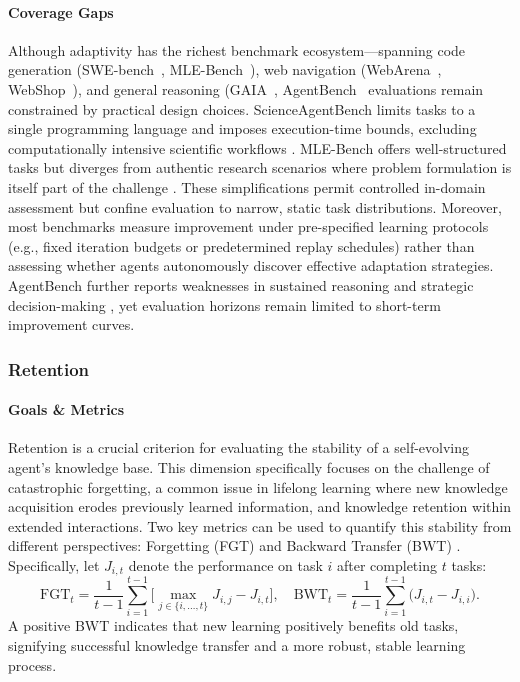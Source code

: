 \documentclass[10pt]{article} %
\begin{document}
\paragraph{Coverage Gaps}
Although adaptivity has the richest benchmark ecosystem—spanning code generation (SWE-bench~\citep{jimenez2023swe}, MLE-Bench~\citep{chan2024mle}), web navigation (WebArena~\citep{zhou2023webarena}, WebShop~\citep{yao2022webshop}), and general reasoning (GAIA~\citep{mialon2023gaia}, AgentBench~\citep{liu2023agentbench} evaluations remain constrained by practical design choices. ScienceAgentBench limits tasks to a single programming language and imposes execution-time bounds, excluding computationally intensive scientific workflows \citep{chen2024scienceagentbench}. MLE-Bench offers well-structured tasks but diverges from authentic research scenarios where problem formulation is itself part of the challenge \citep{chan2024mle}. These simplifications permit controlled in-domain assessment but confine evaluation to narrow, static task distributions. Moreover, most benchmarks measure improvement under pre-specified learning protocols (e.g., fixed iteration budgets or predetermined replay schedules) rather than assessing whether agents autonomously discover effective adaptation strategies. AgentBench further reports weaknesses in sustained reasoning and strategic decision-making \citep{liu2023agentbench}, yet evaluation horizons remain limited to short-term improvement curves.



\subsubsection{Retention}
\paragraph{Goals \& Metrics} Retention is a crucial criterion for evaluating the stability of a self-evolving agent's knowledge base. This dimension specifically focuses on the challenge of catastrophic forgetting, a common issue in lifelong learning where new knowledge acquisition erodes previously learned information, and knowledge retention within extended interactions. Two key metrics can be used to quantify this stability from different perspectives: Forgetting (FGT) and Backward Transfer (BWT) \citep{zheng2025lifelong}. Specifically, let $J_{i,t}$ denote the performance on task $i$ after completing $t$ tasks:
\[
\mathrm{FGT}_t = \frac{1}{t-1} \sum_{i=1}^{t-1}\!\Big[\max_{j\in \{i,\ldots,t\}} J_{i,j} - J_{i,t}\Big],\quad
\mathrm{BWT}_t=\frac{1}{t-1}\sum_{i=1}^{t-1}\big(J_{i,t}-J_{i,i}\big).
\]
A positive BWT indicates that new learning positively benefits old tasks, signifying successful knowledge transfer and a more robust, stable learning process. 
\end{document}
